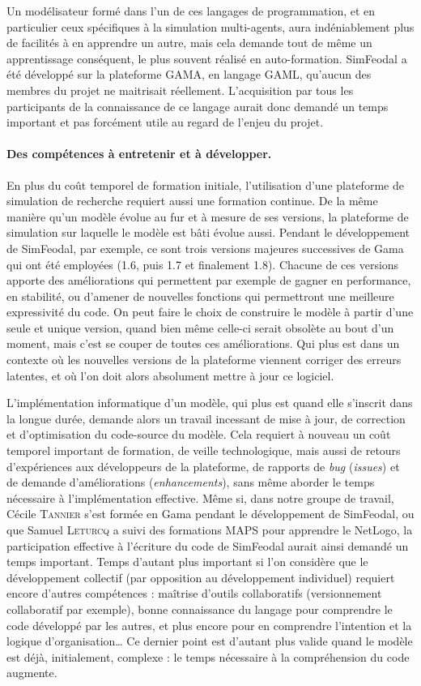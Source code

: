 Un modélisateur formé dans l'un de ces langages de programmation, et en particulier ceux spécifiques à la simulation multi-agents, aura indéniablement plus de facilités à en apprendre un autre, mais cela demande tout de même un apprentissage conséquent, le plus souvent réalisé en auto-formation.
SimFeodal a été développé sur la plateforme GAMA, en langage GAML, qu'aucun des membres du projet ne maitrisait réellement.
L'acquisition par tous les participants de la connaissance de ce langage aurait donc demandé un temps important et pas forcément utile au regard de l'enjeu du projet.

\paragraph{Des compétences à entretenir et à développer.}
En plus du coût temporel de formation initiale, l'utilisation d'une plateforme de simulation \og de recherche\fg{} requiert aussi une formation continue.
De la même manière qu'un modèle évolue au fur et à mesure de ses versions, la plateforme de simulation sur laquelle le modèle est bâti évolue aussi.
Pendant le développement de SimFeodal, par exemple, ce sont trois versions \og majeures\fg{} successives de Gama qui ont été employées (1.6, puis 1.7 et finalement 1.8).
Chacune de ces versions apporte des améliorations qui permettent par exemple de gagner en performance, en stabilité, ou d'amener de nouvelles fonctions qui permettront une meilleure expressivité du code.
On peut faire le choix de construire le modèle à partir d'une seule et unique version, quand bien même celle-ci serait obsolète au bout d'un moment, mais c'est se couper de toutes ces améliorations.
Qui plus est dans un contexte où les nouvelles versions de la plateforme viennent corriger des erreurs latentes, et où l'on doit alors absolument mettre à jour ce logiciel.

L'implémentation informatique d'un modèle, qui plus est quand elle s'inscrit dans la longue durée, demande alors un travail incessant de mise à jour, de correction et d'optimisation du code-source du modèle.
Cela requiert à nouveau un coût temporel important de formation, de veille technologique, mais aussi de retours d'expériences aux développeurs de la plateforme, de rapports de \textit{bug} (\textit{issues}) et de demande d'améliorations (\textit{enhancements}), sans même aborder le temps nécessaire à l'implémentation effective.
Même si, dans notre groupe de travail, Cécile \textsc{Tannier} s'est formée en Gama pendant le développement de SimFeodal, ou que Samuel \textsc{Leturcq} a suivi des formations MAPS pour apprendre le NetLogo, la participation effective à l'écriture du code de SimFeodal aurait ainsi demandé un temps important.
Temps d'autant plus important si l'on considère que le développement collectif (par opposition au développement individuel) requiert encore d'autres compétences :
	maîtrise d'outils collaboratifs (versionnement collaboratif par exemple), bonne connaissance du langage pour comprendre le code développé par les autres, et plus encore pour en comprendre l'intention et la logique d'organisation\ldots
Ce dernier point est d'autant plus valide quand le modèle est déjà, initialement, complexe : le temps nécessaire à la compréhension du code augmente.

